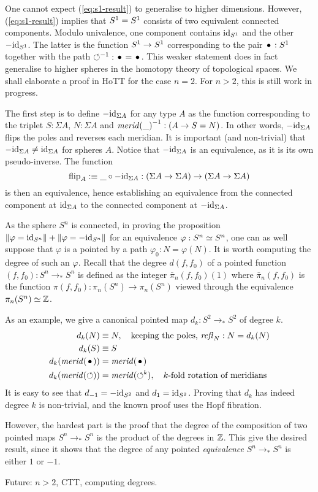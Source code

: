 \documentclass[english,a4]{article}
\newcommand{\Sp}{{S^2}}%
\newcommand{\Sn}{{S^n}}%
\newcommand{\mrd}{\mathit{merid}}%
\newcommand{\susp}[1]{\Sigma{#1}}%
\newcommand{\ptdto}{\to_\ast}%
\newcommand{\flip}{\operatorname{flip}}%
\def\blank{\_}%
\begin{document}
One cannot expect (\ref{eq:s1-result}) to generalise to higher
dimensions. However, (\ref{eq:s1-result}) implies that ${S^1} = {S^1}$
consists of two equivalent connected components. Modulo univalence,
one component contains $\mathord{\mathrm{id}}_{S^1}$ and the other $-\mathord{\mathrm{id}}_{S^1}$. The latter
is the function ${S^1} \to {S^1}$ corresponding to the pair $\base:\Sc$
together with the path $\inv\Sloop:\base=\base$. This weaker statement
does in fact generalise to higher spheres in the homotopy theory of
topological spaces. We shall elaborate a proof in HoTT for the case
$n=2$. For $n>2$, this is still work in progress.

The first step is to define $-\id_{\susp A}$ for any type $A$ as the
function corresponding to the triplet $S:\susp A$, $N:\susp A$ and
$\inv{\mrd(\blank)} : (A \to S=N)$. In other words, $-\id_{\susp A}$
flips the poles and reverses each meridian. It is important (and non-trivial)
that $-\id_{\susp A} \neq \id_{\susp A}$ for spheres $A$.  Notice that
$-\id_{\susp A}$ is an equivalence, as it is its own
pseudo-inverse. The function
\begin{displaymath}
  \flip_A \defequi \blank \circ -\id_{\susp A} : (\susp A \to \susp A) \to (\susp A \to \susp A)
\end{displaymath}
is then an equivalence, hence establishing an equivalence from the
connected component at $\id_{\susp A}$ to the connected component at
$-\id_{\susp A}$.

As the sphere $S^n$ is connected, in proving the proposition
$\Trunc{\varphi=\id_\Sn}+\Trunc{\varphi=-\id_\Sn}$ for an equivalence
$\varphi:\Sn \weq \Sn$, one can as well suppose that $\varphi$ is a
pointed by a path $\varphi_0:N=\varphi(N)$. It is worth computing the
degree of such an $\varphi$. Recall that the degree $d(f,f_0)$ of a
pointed function $(f,f_0):\Sn \ptdto\Sn$ is defined as the integer
$\bar \pi_n(f,f_0)(1)$ where $\bar\pi_n(f,f_0)$ is the function
$\pi(f,f_0) : \pi_n(\Sn) \to \pi_n(\Sn)$ viewed through the
equivalence $\pi_n(\Sn) \weq \ZZ$.

As an example, we give a canonical pointed map $d_k: \Sp \ptdto\Sp$ of degree $k$.
\begin{align*}
  \label{eq:deg-k-func}
  d_k(N)&\jdeq N, \quad\text{keeping the poles, $\refl{N}: N=d_k(N)$}\\
  d_k(S)&\jdeq S\\
  d_k(\mrd(\base))&= \mrd(\base)\\
  d_k(\mrd(\Sloop))&= \mrd(\Sloop^{k}),\quad\text{$k$-fold rotation of meridians}
\end{align*}
It is easy to see that $d_{-1} = -\id_{\Sp}$   and $d_1 = \id_{\Sp}$.
Proving that $d_k$ has indeed degree $k$ is non-trivial, and the known
proof uses the Hopf fibration.

However, the hardest part is the proof that the degree of the composition of
two pointed maps $\Sn \ptdto\Sn$ is the product of the degrees in $\mathbb{Z}$.
This give the desired result, since it shows that the degree of any pointed 
\emph{equivalence} $\Sn \ptdto\Sn$ is either $1$ or $-1$. 

Future: $n>2$, CTT, computing degrees.




\end{document}
